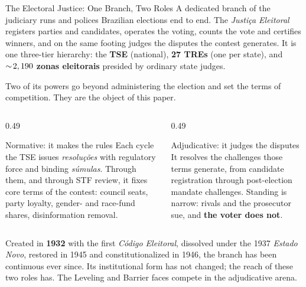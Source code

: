
\begin{frame}{The Electoral Justice: One Branch, Two Roles}
\hypertarget{src:ejustice}{}
\small
A dedicated branch of the judiciary runs and polices Brazilian elections end to end. The \emph{Justi\c{c}a Eleitoral} registers parties and candidates, operates the voting, counts the vote and certifies winners, and on the same footing judges the disputes the contest generates. It is one three-tier hierarchy: the \textbf{TSE} (national), \textbf{27 TREs} (one per state), and $\sim\!2,190{}$ \textbf{zonas eleitorais} presided by ordinary state judges.
\smallskip

Two of its powers go beyond administering the election and set the terms of competition. They are the object of this paper.
\smallskip
\begin{columns}[T]
\begin{column}{0.49\textwidth}
  \begin{block}{\textcolor{myblue}{Normative}: it makes the rules}
  \scriptsize Each cycle the TSE issues \emph{resolu\c{c}\~oes} with regulatory force and binding \emph{s\'umulas}. Through them, and through STF review, it fixes core terms of the contest: council seats, party loyalty, gender- and race-fund shares, disinformation removal.
  \end{block}
\end{column}
\begin{column}{0.49\textwidth}
  \begin{block}{\textcolor{myred}{Adjudicative}: it judges the disputes}
  \scriptsize It resolves the challenges those terms generate, from candidate registration through post-election mandate challenges. Standing is narrow: rivals and the prosecutor sue, and \textbf{the voter does not}.
  \end{block}
\end{column}
\end{columns}
\smallskip

\footnotesize Created in \textbf{1932} with the first \emph{C\'odigo Eleitoral}, dissolved under the 1937 \emph{Estado Novo}, restored in 1945 and constitutionalized in 1946, the branch has been continuous ever since. Its institutional form has not changed; the reach of these two roles has. The \textcolor{mygreen}{Leveling} and \textcolor{myred}{Barrier} faces compete in the adjudicative arena.
\end{frame}
